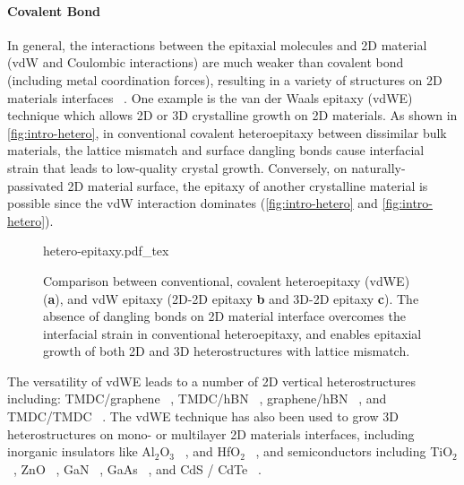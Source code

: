 \paragraph{Covalent Bond}
In general, the interactions between the epitaxial molecules and 2D
material (vdW and Coulombic interactions) are much weaker than
covalent bond (including metal coordination forces), resulting in a
variety of structures on 2D materials interfaces
~\autocite{Bakti_Utama_2013_rev_epitax}. One example is the van der Waals
epitaxy (vdWE) technique which allows 2D or 3D crystalline growth on
2D materials. As shown in \autoref{fig:intro-hetero}, in conventional
covalent heteroepitaxy between dissimilar bulk materials, the lattice
mismatch and surface dangling bonds cause interfacial strain that
leads to low-quality crystal growth. Conversely, on
naturally-passivated 2D material surface, the epitaxy of another
crystalline material is possible since the vdW interaction dominates
(\autoref{fig:intro-hetero} and \autoref{fig:intro-hetero}).
\begin{figure}[h]
  \centering
  {hetero-epitaxy.pdf_tex}
  \caption{\label{fig:intro-hetero} %
    Comparison between conventional, covalent hetero\-epitaxy (vdWE)
    (\textbf{a}), and vdW epitaxy (2D-2D epitaxy \textbf{b} and 3D-2D
    epitaxy \textbf{c}). The absence of dangling bonds on 2D material
    interface overcomes the interfacial strain in
    conventional hetero\-epitaxy, and enables epitaxial growth of both
    2D and 3D heterostructures with lattice mismatch.%
  }
\end{figure}

The versatility of vdWE leads to a number of 2D vertical
heterostructures including: TMDC/\allowbreak{}graphene
~\autocite{Shi_2012_vdw_epi_MoS2_gr,Liu_2016_epi_MoS2_gr_rotation,Lin_2014_vdW_solid,Lin_2015_Wse2_MoS2_gr,Azizi_2015_Freevdw_Gr_TMDCs,Kim_2016_BiSnTe_gr},
TMDC/\allowbreak{}hBN
~\autocite{Yan_2015_MoS2_on_hBN,Wang_2015_cvd_MoS2_BN,Cattelan_2015_Ws2_hBN},
graphene/\allowbreak{}hBN
~\autocite{Liu_2011_gr_hBN,Zhang_2015_gr_hBN,Driver_2016_MBE_gr_hBN}, and
TMDC/\allowbreak{}TMDC
~\autocite{Zhang_2014_vdw_epi_SnS2_MoS2,Diaz_2015_MoTe2_MoSe2,Gong_2014_WS2_MoS2,Alemayehu_2015_TMDC_vdw}.
%
The vdWE technique has also been used to grow 3D heterostructures on
mono- or multilayer 2D materials interfaces, including inorganic
insulators like Al\(_{\text{2}}\)O\(_{\text{3}}\)
~\autocite{Zhang_2014_Al2O3_ALO_Gr,Vaziri_2013_ALD_Al2O3_gr}, and
HfO\(_{\text{2}}\) ~\autocite{Alaboson_2011_PTCDA_gr_ALD},
%
and semiconductors including TiO\(_{\text{2}}\)
~\autocite{Li_2015_TiO2_GO,Kumar_2011_TiO2_piezo_gr,Zhang_2011_TiO2_gr},
ZnO ~\autocite{Chung_2010_GaN_ZnO_gr,Oh_2014_ZnO_hBN}, GaN
~\autocite{Kobayashi_2012_GaN_hBN,Kim_2014_direct_vdw_GaN_gr,Kim_2017_remote_epi_Gr},
GaAs
~\autocite{Alaskar_2015_GaAs_gr_Si_theor,Kim_2017_remote_epi_Gr,Kong_2018_vdw_polar}, and CdS / CdTe
~\autocite{Loeher_1994_vdw_epi_CdS_MoTe,Loeher_1996_CdTe_MoWTe}.

